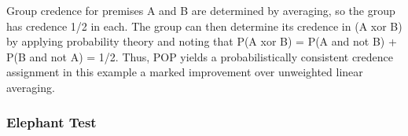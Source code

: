 \documentclass{article}
\begin{document}
Group credence for premises A and B are determined by averaging, so the group has credence 1/2 in each. The group can then determine its credence in (A xor B) by applying probability theory and noting that P(A xor B) = P(A and not B) + P(B and not A) = 1/2. Thus, POP yields a probabilistically consistent credence assignment in this example \textemdash{} a marked improvement over unweighted linear averaging. 

\subsubsection{Elephant Test}



\end{document}
